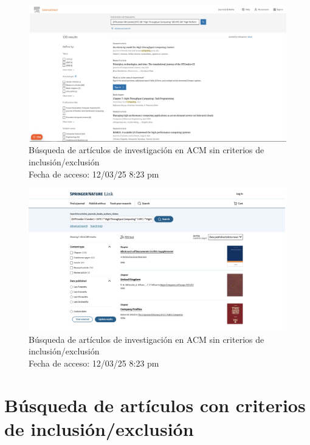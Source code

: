 \FloatBarrier

\begin{figure}[H]
	\centering
	\includegraphics[width=\textwidth,keepaspectratio]{apendices/bases-datos/sin-exclusion/science-direct.png}
	\caption{Búsqueda de artículos de investigación en ACM sin criterios de inclusión/exclusión \\
		Fecha de acceso: 12/03/25 8:23 pm
	}\label{fig:busqueda-science-direct-no-exclusion}
\end{figure}

\begin{figure}[H]
	\centering
	\includegraphics[width=\textwidth,keepaspectratio]{apendices/bases-datos/sin-exclusion/springer.png}
	\caption{Búsqueda de artículos de investigación en ACM sin criterios de inclusión/exclusión \\
		Fecha de acceso: 12/03/25 8:23 pm
	}\label{fig:busqueda-springer-no-exclusion}
\end{figure}




\section{Búsqueda de artículos con criterios de inclusión/exclusión}\label{sec:busqueda-con-criterios}

